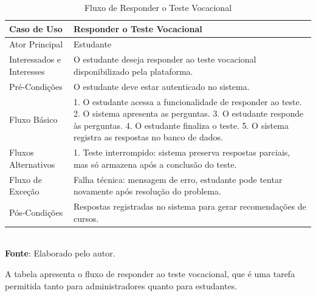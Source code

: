 \begin{table}[h!]
\centering
\caption{Fluxo de Responder o Teste Vocacional}
\begin{tabular}{|m{4cm}|m{11cm}|}
\hline
\textbf{Caso de Uso}   & \textbf{Responder o Teste Vocacional} \\
\hline
Ator Principal & Estudante\\
\hline
Interessados e Interesses & O estudante deseja responder ao teste vocacional disponibilizado pela plataforma. \\
\hline
Pré-Condições & 

O estudante deve estar autenticado no sistema. \\
\hline
Fluxo Básico & 
1. O estudante acessa a funcionalidade de responder ao teste.
2. O sistema apresenta as perguntas.
3. O estudante responde às perguntas.
4. O estudante finaliza o teste.
5. O sistema registra as respostas no banco de dados.
\\
\hline
Fluxos Alternativos & 

1. Teste interrompido: sistema preserva respostas parciais, mas só armazena após a conclusão do teste.
\\
\hline
Fluxo de Exceção & Falha técnica: mensagem de erro, estudante pode tentar novamente após resolução do problema. \\
\hline
Pós-Condições & Respostas registradas no sistema para gerar recomendações de cursos.\\
\hline
\end{tabular}
\label{table:casos-de-uso}
\\[1ex]
\footnotesize \textbf{Fonte}: Elaborado pelo autor.
\end{table}

A tabela apresenta o fluxo de responder ao teste vocacional, que é uma tarefa permitida tanto para administradores quanto para estudantes.


